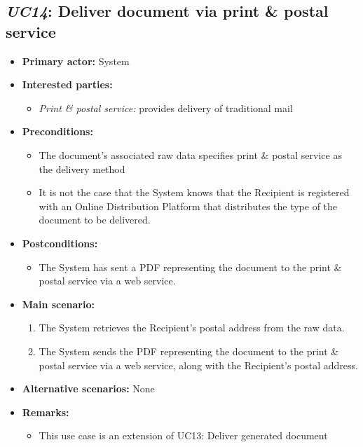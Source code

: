 \documentclass[a4paper,10pt]{article}
\begin{document}
\subsection{\emph{UC14}: Deliver document via print \& postal service}
\begin{itemize}
    \item \textbf{Primary actor:} System
    \item \textbf{Interested parties:} 
        \begin{itemize}
            \item \textit{Print \& postal service:} provides delivery of traditional mail
        \end{itemize}

    \item \textbf{Preconditions:}
        \begin{itemize}
            \item The document's associated raw data specifies print \& postal service as the delivery method
            \item It is not the case that the System knows that the Recipient is registered with an Online Distribution Platform that distributes the type of the document to be delivered.
        \end{itemize}

    \item \textbf{Postconditions:}
        \begin{itemize}
            \item The System has sent a PDF representing the document to the print \& postal service via a web service.
        \end{itemize}
        
    \item \textbf{Main scenario:} 
    \begin{enumerate}
       \item The System retrieves the Recipient's postal address from the raw data.
       \item The System sends the PDF representing the document to the print \& postal service via a web service, along with the Recipient's postal address.
    \end{enumerate}

    \item \textbf{Alternative scenarios:} 
    None
    
    \item \textbf{Remarks:}
        \begin{itemize}
            \item This use case is an extension of UC13: Deliver generated document
        \end{itemize}
\end{itemize}
\end{document}
